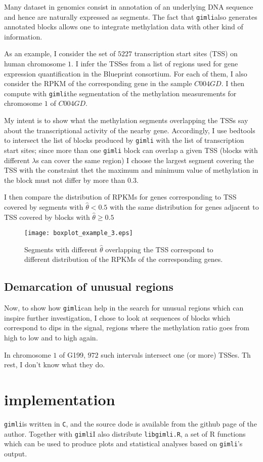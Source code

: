 \documentclass[11pt]{amsart}
\newcommand{\gimli}{\texttt{gimli}}
\begin{document}
Many dataset in genomics consist in annotation of an underlying
DNA sequence and hence are naturally expressed as segments. The
fact that \gimli also generates annotated blocks allows one to
integrate methylation data with other kind of information.

As an example, I consider the set of $5227$ transcription start sites
(TSS) on human chromosome $1$. I infer the TSSes from a list of 
regions used for gene expression quantification in the Blueprint 
consortium. For each of them, I also consider the RPKM of the corresponding
gene in the sample $C004GD$. I then compute with \gimli the segmentation
of the methylation measurements for chromosome $1$ of $C004GD$.

My intent is to show what the methylation segments overlapping the TSSs
say about the transcriptional activity of the nearby gene. Accordingly,
I use bedtools to intersect the list of blocks produced by \gimli
with the list of transcription start sites; since more than one \gimli
block can overlap a given TSS (blocks with different $\lambda$s can 
cover the same region) I choose the largest segment covering the TSS
with the constraint thet the maximum and minimum value of methylation
in the block must not differ by more than $0.3$.

I then compare the distribution of RPKMs for genes corresponding
to TSS covered by segments with $\hat{\theta}<0.5$ with the same distribution
for genes adjacent to TSS covered by blocks with $\hat{\theta} \geq 0.5$

\begin{figure}\label{ex3}
\texttt{[image: boxplot\_example\_3.eps]}
\caption{Segments with different $\hat{\theta}$ overlapping the TSS correspond
to different distribution of the RPKMs of the corresponding genes.}
\end{figure}

\subsection{Demarcation of unusual regions} 

Now, to show how \gimli can help in the search for unusual regions which
can inspire further investigation, I chose to look at sequences of blocks 
which correspond to dips in the signal, regions where the methylation
ratio goes from high to low and to high again.

In chromosome $1$ of G199, $972$ such intervals intersect one (or more) 
TSSes. Th rest, I don't know what they do.



\section{implementation}

\gimli is written in \texttt{C}, and the source
dode is available from the github page of the author. Together
with \gimli I also distribute \texttt{libgimli.R},
a set of R functions which can be used to produce plots and statistical
analyses based on \gimli's output.


\end{document}
